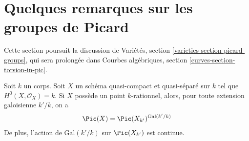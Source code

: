 \section{Quelques remarques sur les groupes de Picard}
\label{section-remarks-picard}

\noindent
Cette section poursuit la discussion de
Variétés, section \ref{varieties-section-picard-groups},
qui sera prolongée dans
Courbes algébriques, section \ref{curves-section-torsion-in-pic}.

\begin{lemma}
\label{lemma-pic-descends}
Soit $k$ un corps. Soit $X$ un schéma quasi-compact et quasi-séparé
sur $k$ tel que $H^0(X, \mathcal{O}_X) = k$. Si $X$ possède un point $k$-rationnel,
alors, pour toute extension galoisienne $k'/k$, on a
$$
\Pic(X) = \Pic(X_{k'})^{\text{Gal}(k'/k)}
$$
De plus, l'action de $\text{Gal}(k'/k)$ sur $\Pic(X_{k'})$
est continue.
\end{lemma}

